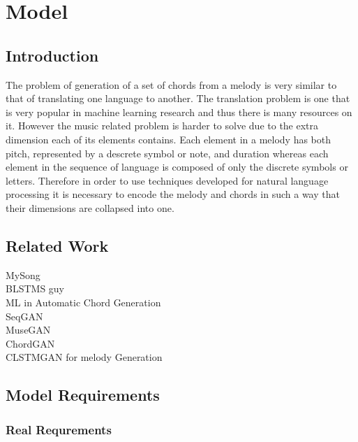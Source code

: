 
\chapter{Model} %

\label{Chapter4} %


\section{Introduction}


The problem of generation of a set of chords from a melody is very similar to that of translating one language to another. 
The translation problem is one that is very popular in machine learning research and thus there is many resources on it.  
However the music related problem is harder to solve due to the extra dimension each of its elements contains. 
Each element in a melody has both pitch, represented by a descrete symbol or note, and duration whereas each element in the sequence of language is composed of only the discrete symbols or letters.  
Therefore in order to use techniques developed for natural language processing it is necessary to encode the melody and chords in such a way that their dimensions are collapsed into one. 

\section{Related Work}

MySong \\
BLSTMS guy \\
ML in Automatic Chord Generation \\
SeqGAN \\  
MuseGAN \\      
ChordGAN \\       
CLSTMGAN for melody Generation \\

\section{Model Requirements}
\subsection{Real Requrements}

